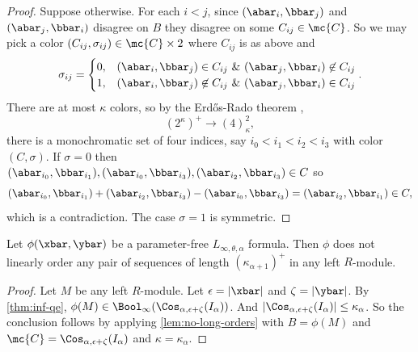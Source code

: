 \documentclass[11pt]{article}
\begin{document}
\begin{proof}
    Suppose otherwise. 
    For each $i < j$, since $(\abar_i,\bbar_j)$ and $(\abar_j,\bbar_i)$ disagree on $B$ they disagree on some $C_{ij} \in \mc{C}$. 
    So we may pick a color $(C_{ij}, \sigma_{ij}) \in \mc{C} \times 2$ where $C_{ij}$ is as above and
    \[
    \sigma_{ij} = \begin{cases}
        0, & (\abar_i,\bbar_j) \in C_{ij} \ \& \  (\abar_j,\bbar_i) \not\in C_{ij} \\
        1, & (\abar_i,\bbar_j) \not\in C_{ij} \ \& \ (\abar_j,\bbar_i) \in C_{ij}
    \end{cases}.
    \]
    There are at most $\kappa$ colors, so by the Erd\H{o}s-Rado theorem \cite{ER1956},
    \[ 
        (2^\kappa)^+ \to (4)^2_\kappa,
    \]
    there is a monochromatic set of four indices, say $i_0 < i_1 < i_2 < i_3$ with color $(C,\sigma)$. 
    If $\sigma = 0$ then $(\abar_{i_0}, \bbar_{i_1}), (\abar_{i_0}, \bbar_{i_3}), (\abar_{i_2}, \bbar_{i_3}) \in C$ so
    \[ 
        (\abar_{i_0}, \bbar_{i_1}) + (\abar_{i_2}, \bbar_{i_3}) - (\abar_{i_0}, \bbar_{i_3}) =  (\abar_{i_2}, \bbar_{i_1}) \in C, 
    \]
    which is a contradiction. 
    The case $\sigma = 1$ is symmetric.
\end{proof}

\begin{corollary}[Shelah]
    Let $\phi(\xbar,\ybar)$ be a parameter-free $L_{\infty,\theta,\alpha}$ formula.
    Then $\phi$ does not linearly order any pair of sequences of length $(\kappa_{\alpha+1})^+$ in any left $R$-module.
\end{corollary}

\begin{proof}
    Let $M$ be any left $R$-module.
    Let $\epsilon = |\xbar|$ and $\zeta = |\ybar|$.
    By \cref{thm:inf-qe}, $\phi(M) \in \Bool_\infty(\Cos_{\alpha,\epsilon+\zeta}(I_\alpha))$. 
    And $|\Cos_{\alpha,\epsilon+\zeta}(I_\alpha)| \leq \kappa_\alpha$. 
    So the conclusion follows by applying \cref{lem:no-long-orders} with $B = \phi(M)$ and $\mc{C} = \Cos_{\alpha,\epsilon+\zeta}(I_\alpha)$ and $\kappa = \kappa_\alpha$.
\end{proof}
\end{document}
